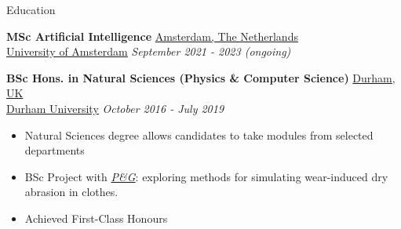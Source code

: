 \documentclass{resume} %
\begin{document}
\begin{rSection}{Education}

	{\bf MSc Artificial Intelligence} \hfill \underline{Amsterdam, The Netherlands}
	\\\href{https://www.dur.ac.uk/}{\underline{University of Amsterdam}} \hfill {\em September 2021
	- 2023 (ongoing)}

	{\bf BSc Hons. in Natural Sciences (Physics \& Computer Science)} \hfill \underline{Durham, UK}
	\\\href{https://www.dur.ac.uk/}{\underline{Durham University}} \hfill {\em October 2016 - July 2019}
	\begin{itemize}\vspace{-0.5em}
		\item Natural Sciences degree allows candidates to take modules from selected departments
		\item BSc Project with \href{https://us.pg.com/}{\textit{P\&G}}: exploring methods for simulating wear-induced dry abrasion in clothes.
		\item Achieved First-Class Honours
	\end{itemize}
\end{rSection}
\end{document}
